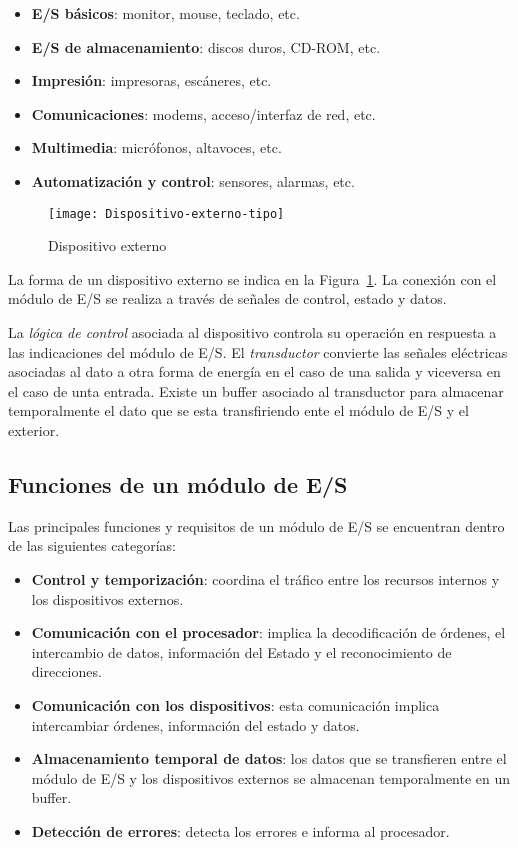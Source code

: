 \begin{itemize}
  \item \textbf{E/S básicos}: monitor, mouse, teclado, etc.
  \item \textbf{E/S de almacenamiento}: discos duros, CD-ROM, etc.
  \item \textbf{Impresión}: impresoras, escáneres, etc.
  \item \textbf{Comunicaciones}: modems, acceso/interfaz de red, etc.
  \item \textbf{Multimedia}: micrófonos, altavoces, etc.
  \item \textbf{Automatización y control}: sensores, alarmas, etc.
\end{itemize}

\begin{figure}[H]
  \centering
  \texttt{[image: Dispositivo-externo-tipo]}
  \caption{Dispositivo externo}\label{fig:Dispositivo-externo-tipo}
\end{figure}

La forma de un dispositivo externo se indica en la Figura~\ref{fig:Dispositivo-externo-tipo}. La conexión con el módulo de E/S se realiza a través de señales de control, estado y datos.

La \textit{lógica de control} asociada al dispositivo controla su operación en respuesta a las indicaciones del módulo de E/S. El \textit{transductor} convierte las señales eléctricas asociadas al dato a otra forma de energía en el caso de una salida y viceversa en el caso de unta entrada. Existe un buffer asociado al transductor para almacenar temporalmente el dato que se esta transfiriendo ente el módulo de E/S y el exterior.

\subsection{Funciones de un módulo de E/S}

Las principales funciones y requisitos de un módulo de E/S se encuentran dentro de las siguientes categorías:

\begin{itemize}
  \item \textbf{Control y temporización}: coordina el tráfico entre los recursos internos y los dispositivos externos.
  \item \textbf{Comunicación con el procesador}: implica la decodificación de órdenes, el intercambio de datos, información del Estado y el reconocimiento de direcciones.
  \item \textbf{Comunicación con los dispositivos}: esta comunicación implica intercambiar órdenes, información del estado y datos.
  \item \textbf{Almacenamiento temporal de datos}: los datos que se transfieren entre el módulo de E/S y los dispositivos externos se almacenan temporalmente en un buffer.
  \item \textbf{Detección de errores}: detecta los errores e informa al procesador.
\end{itemize}

